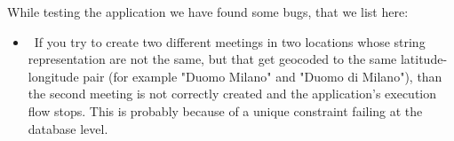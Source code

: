 While testing the application we have found some bugs, that we list here:

\begin{itemize}
	\item~If you try to create two different meetings in two locations whose string representation are not the same, but that get geocoded to the same latitude-longitude pair (for example "Duomo Milano" and "Duomo di Milano"), than the second meeting is not correctly created and the application's execution flow stops. This is probably because of a unique constraint failing at the database level.
\end{itemize}